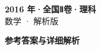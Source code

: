 \documentclass[zihao=-4, a4paper]{ctexart}
\begin{document}
\begin{center}
  {\Large\bfseries 2016 年·全国Ⅱ卷·理科}\\[4pt]
  {\large 数学 · 解析版}
\end{center}
\medskip
{}

\clearpage
{}
\begin{center}{\Large\bfseries 参考答案与详细解析}\end{center}
\medskip

\end{document}
